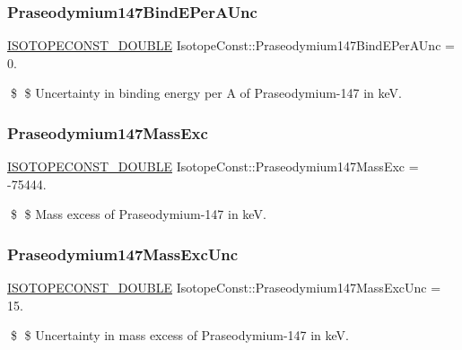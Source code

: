 \subsubsection{\texorpdfstring{Praseodymium147\+Bind\+E\+Per\+A\+Unc}{Praseodymium147BindEPerAUnc}}
{\footnotesize\ttfamily \mbox{\hyperlink{group___isotope_const-_macros_ga8f45a7272ce02c0b4c65c44636ed719a}{I\+S\+O\+T\+O\+P\+E\+C\+O\+N\+S\+T\+\_\+\+D\+O\+U\+B\+LE}} Isotope\+Const\+::\+Praseodymium147\+Bind\+E\+Per\+A\+Unc = 0.}

\$ \$ Uncertainty in binding energy per A of Praseodymium-\/147 in keV. \mbox{\label{group___isotope_const-_praseodymium-_pr147_ga2265609de52851618901ecd99879401a}} 
\subsubsection{\texorpdfstring{Praseodymium147\+Mass\+Exc}{Praseodymium147MassExc}}
{\footnotesize\ttfamily \mbox{\hyperlink{group___isotope_const-_macros_ga8f45a7272ce02c0b4c65c44636ed719a}{I\+S\+O\+T\+O\+P\+E\+C\+O\+N\+S\+T\+\_\+\+D\+O\+U\+B\+LE}} Isotope\+Const\+::\+Praseodymium147\+Mass\+Exc = -\/75444.}

\$ \$ Mass excess of Praseodymium-\/147 in keV. \mbox{\label{group___isotope_const-_praseodymium-_pr147_gab20efe83035d6d15036cfd264474b032}} 
\subsubsection{\texorpdfstring{Praseodymium147\+Mass\+Exc\+Unc}{Praseodymium147MassExcUnc}}
{\footnotesize\ttfamily \mbox{\hyperlink{group___isotope_const-_macros_ga8f45a7272ce02c0b4c65c44636ed719a}{I\+S\+O\+T\+O\+P\+E\+C\+O\+N\+S\+T\+\_\+\+D\+O\+U\+B\+LE}} Isotope\+Const\+::\+Praseodymium147\+Mass\+Exc\+Unc = 15.}

\$ \$ Uncertainty in mass excess of Praseodymium-\/147 in keV. \mbox{\label{group___isotope_const-_praseodymium-_pr147_ga139e8f61592af3be6e507bc81fe44aed}} 
